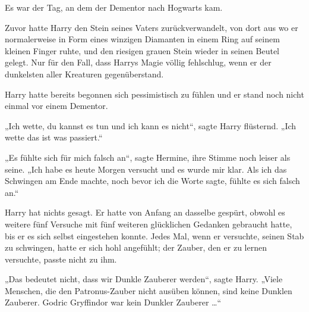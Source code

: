 Es war der Tag, an dem der Dementor nach Hogwarts kam.

Zuvor hatte Harry den Stein seines Vaters zurückverwandelt, von dort aus wo er normalerweise in Form eines winzigen Diamanten in einem Ring auf seinem kleinen Finger ruhte, und den riesigen grauen Stein wieder in seinen Beutel gelegt. Nur für den Fall, dass Harrys Magie völlig fehlschlug, wenn er der dunkelsten aller Kreaturen gegenüberstand.

Harry hatte bereits begonnen sich pessimistisch zu fühlen und er stand noch nicht einmal vor einem Dementor.

„Ich wette, du kannst es tun und ich kann es nicht“, sagte Harry flüsternd.
„Ich wette das ist was passiert.“

„Es fühlte sich für mich falsch an“, sagte Hermine, ihre Stimme noch leiser als seine.
„Ich habe es heute Morgen versucht und es wurde mir klar. Als ich das Schwingen am Ende machte, noch bevor ich die Worte sagte, fühlte es sich falsch an.“

Harry hat nichts gesagt. Er hatte von Anfang an dasselbe gespürt, obwohl es weitere fünf Versuche mit fünf weiteren glücklichen Gedanken gebraucht hatte, bis er es sich selbst eingestehen konnte. Jedes Mal, wenn er versuchte, seinen Stab zu schwingen, hatte er sich hohl angefühlt; der Zauber, den er zu lernen versuchte, passte nicht zu ihm.

„Das bedeutet nicht, dass wir Dunkle Zauberer werden“, sagte Harry.
„Viele Menschen, die den Patronus-Zauber nicht ausüben können, sind keine Dunklen Zauberer. Godric Gryffindor war kein Dunkler Zauberer …“

